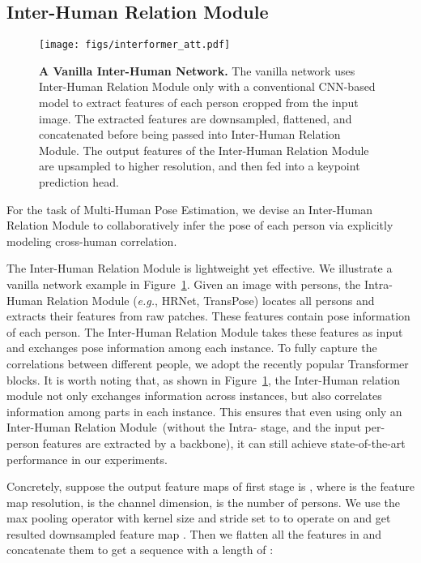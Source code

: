 \documentclass{article}
\begin{document}
\subsection{Inter-Human Relation Module}\label{InterModule}


\begin{figure}[t]
 \centering
    \texttt{[image: figs/interformer\_att.pdf]}
  \caption{\textbf{A Vanilla Inter-Human Network.} The vanilla network uses Inter-Human Relation Module only with a conventional CNN-based model to extract features of each person cropped from the input image. The extracted features are  downsampled, flattened, and concatenated before being passed into Inter-Human Relation Module. The output features of the Inter-Human Relation Module are upsampled to higher resolution, and then fed into a keypoint prediction head.}
  \label{interformer}
\end{figure}





For the task of Multi-Human Pose Estimation, we devise an Inter-Human Relation Module to collaboratively infer the pose of each person via explicitly modeling cross-human correlation. 

The Inter-Human Relation Module is lightweight yet effective. We illustrate a vanilla network example in Figure~\ref{interformer}. Given an image  with  persons, the Intra-Human Relation Module (\emph{e.g.}, HRNet, TransPose) locates all persons and extracts their features  from raw patches. These features contain pose information of each person. The Inter-Human Relation Module takes these features as input and exchanges pose information among each instance. To fully capture the correlations between different people, we adopt the recently popular Transformer blocks.
It is worth noting that, as shown in Figure~\ref{interformer}, the Inter-Human relation module not only exchanges information across instances, but also correlates information among parts in each instance. This ensures that even using only an Inter-Human Relation Module~(without the Intra- stage, and the input per-person features are extracted by a backbone), it can still achieve state-of-the-art performance in our experiments. 



Concretely, suppose the output feature maps of first stage is , where  is the feature map resolution,  is the channel dimension,  is the number of persons. We use the max pooling operator with kernel size and stride set to  to operate on  and get resulted downsampled feature map . Then we flatten all the features in  and concatenate them to get a sequence with a length of : 
\end{document}
